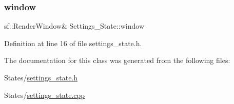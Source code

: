 \subsubsection{\texorpdfstring{window}{window}}
{\footnotesize\ttfamily sf\+::\+Render\+Window\& Settings\+\_\+\+State\+::window}



Definition at line 16 of file settings\+\_\+state.\+h.



The documentation for this class was generated from the following files\+:\begin{DoxyCompactItemize}
\item 
States/\hyperlink{settings__state_8h}{settings\+\_\+state.\+h}\item 
States/\hyperlink{settings__state_8cpp}{settings\+\_\+state.\+cpp}\end{DoxyCompactItemize}
